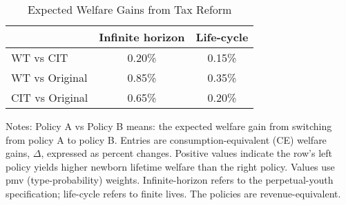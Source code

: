 \begin{table}[!htbp]
\centering
\caption{Expected Welfare Gains from Tax Reform}
\label{tab:ce_welfare_tax}
\begin{threeparttable}
\begin{tabular}{lcc}
\toprule
& \textbf{Infinite horizon} & \textbf{Life-cycle} \\
\midrule
WT vs CIT       & 0.20\% & 0.15\% \\
WT vs Original  & 0.85\% & 0.35\% \\
CIT vs Original & 0.65\% & 0.20\% \\
\bottomrule
\end{tabular}
\begin{tablenotes}[flushleft]
\footnotesize
\item Notes: Policy A vs Policy B means: the expected welfare gain from switching from policy A to policy B. Entries are consumption-equivalent (CE) welfare gains, $\Delta$, expressed as percent changes. Positive values indicate the row’s left policy yields higher newborn lifetime welfare than the right policy. Values use pmv (type-probability) weights. Infinite-horizon refers to the perpetual-youth specification; life-cycle refers to finite lives. The policies are revenue-equivalent. 
\end{tablenotes}
\end{threeparttable}
\end{table}
